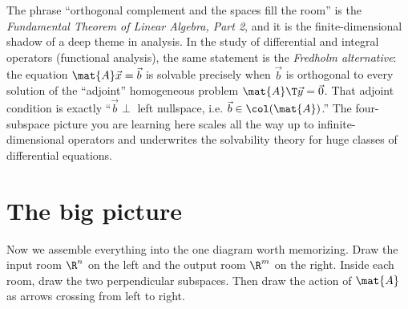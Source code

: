 \begin{connectionbox}
The phrase ``orthogonal complement and the spaces fill the room'' is the
\emph{Fundamental Theorem of Linear Algebra, Part 2}, and it is the finite-dimensional shadow of a
deep theme in analysis. In the study of differential and integral operators (functional analysis),
the same statement is the \emph{Fredholm alternative}: the equation $\mat{A}\vec{x}=\vec{b}$ is
solvable precisely when $\vec{b}$ is orthogonal to every solution of the ``adjoint'' homogeneous
problem $\mat{A}\T\vec{y}=\vec{0}$. That adjoint condition is exactly ``$\vec{b}\perp$ left
nullspace, i.e. $\vec{b}\in\col(\mat{A})$.'' The four-subspace picture you are learning here scales
all the way up to infinite-dimensional operators and underwrites the solvability theory for huge
classes of differential equations.
\end{connectionbox}

\section{The big picture}

Now we assemble everything into the one diagram worth memorizing. Draw the input room $\R^n$ on
the left and the output room $\R^m$ on the right. Inside each room, draw the two perpendicular
subspaces. Then draw the action of $\mat{A}$ as arrows crossing from left to right.

